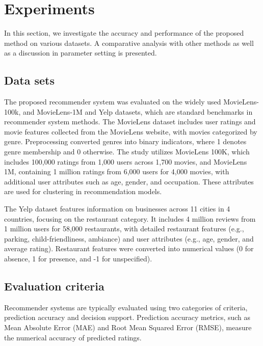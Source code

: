 \documentclass{article}
\theoremstyle{plain}
\theoremstyle{definition}
\theoremstyle{remark}
\begin{document}




























\section{Experiments}
In this section, we investigate the accuracy and performance of the proposed method on various datasets. A comparative analysis with other methods as well as a discussion in parameter setting  is presented.

\subsection{Data sets}
The proposed recommender system was evaluated on the widely used MovieLens-100k, and MovieLens-1M and Yelp datasets, which are standard benchmarks in recommender system methods.
The MovieLens dataset includes user ratings and movie features collected from the MovieLens website, with movies categorized by genre. Preprocessing converted genres into binary indicators, where 1 denotes genre membership and 0 otherwise. The study utilizes MovieLens 100K, which includes 100,000 ratings from 1,000 users across 1,700 movies, and MovieLens 1M, containing 1 million ratings from 6,000 users for 4,000 movies, with additional user attributes such as age, gender, and occupation. These attributes are used for clustering in recommendation models.

The Yelp dataset features information on businesses across 11 cities in 4 countries, focusing on the restaurant category. It includes 4 million reviews from 1 million users for 58,000 restaurants, with detailed restaurant features (e.g., parking, child-friendliness, ambiance) and user attributes (e.g., age, gender, and average rating). Restaurant features were converted into numerical values (0 for absence, 1 for presence, and -1 for unspecified).

\subsection{Evaluation criteria}
Recommender systems are typically evaluated using two categories of criteria, prediction accuracy and decision support. Prediction accuracy metrics, such as Mean Absolute Error (MAE) and Root Mean Squared Error (RMSE), measure the numerical accuracy of predicted ratings. 
\end{document}

